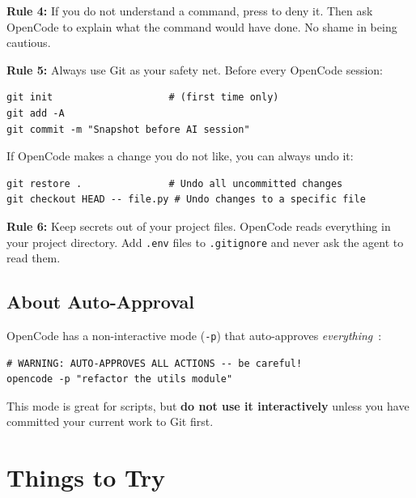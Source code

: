 \documentclass[11pt]{article}
\newcommand{\key}[1]{\keystroke{#1}}
\newcommand{\keystroke}[1]{%
  \tikz[baseline=(key.base)]{%
    \node[draw, rounded corners=2pt, inner sep=2pt, fill=gray!10,
          font=\ttfamily\small] (key) {#1};%
  }%
}
\begin{document}
\begin{alert-box}
\textbf{Rule 4:} If you do not understand a command, press \key{d} to deny it.  Then ask OpenCode to explain what the command would have done.  No shame in being cautious.
\end{alert-box}

\begin{alert-box}
\textbf{Rule 5:} Always use Git as your safety net.  Before every OpenCode session:
\begin{lstlisting}[style=term]
git init                    # (first time only)
git add -A
git commit -m "Snapshot before AI session"
\end{lstlisting}
If OpenCode makes a change you do not like, you can always undo it:
\begin{lstlisting}[style=term]
git restore .               # Undo all uncommitted changes
git checkout HEAD -- file.py # Undo changes to a specific file
\end{lstlisting}
\end{alert-box}

\begin{alert-box}
\textbf{Rule 6:} Keep secrets out of your project files.  OpenCode reads everything in your project directory.  Add \texttt{.env} files to \texttt{.gitignore} and never ask the agent to read them.
\end{alert-box}

\subsection{About Auto-Approval}

OpenCode has a non-interactive mode (\texttt{-p}) that auto-approves \emph{everything}~\cite{opencode_readme2025}:

\begin{lstlisting}[style=term]
# WARNING: AUTO-APPROVES ALL ACTIONS -- be careful!
opencode -p "refactor the utils module"
\end{lstlisting}

\begin{def-box}
This mode is great for scripts, but \textbf{do not use it interactively} unless you have committed your current work to Git first.
\end{def-box}

\section{Things to Try}
\end{document}
